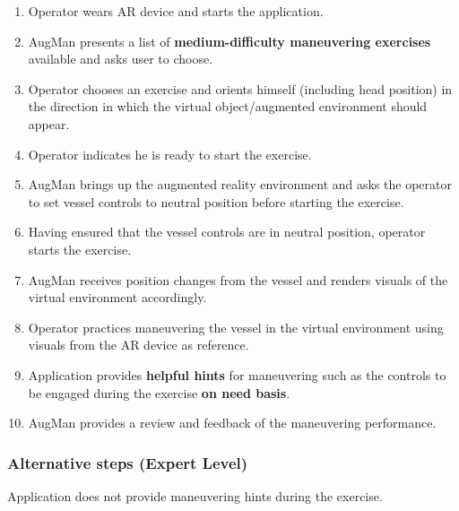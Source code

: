 \begin{enumerate}[noitemsep]
	\item Operator wears AR device and starts the application. 
	\item AugMan presents a list of \textbf{medium-difficulty maneuvering exercises} available and asks user to choose.
	\item Operator chooses an exercise and orients himself (including head position) in the direction in which the virtual object/augmented environment should appear.
	\item Operator indicates he is ready to start the exercise.
	\item AugMan brings up the augmented reality environment and asks the operator to set vessel controls to neutral position before starting the exercise.
	\item Having ensured that the vessel controls are in neutral position, operator starts the exercise. 
	\item AugMan receives position changes from the vessel and renders visuals of the virtual environment accordingly.
	\item Operator practices maneuvering the vessel in the virtual environment using visuals from the AR device as reference.
	\item Application provides \textbf{helpful hints} for maneuvering such as the controls to be engaged during the exercise \textbf{on need basis}.
	\item AugMan provides a review and feedback of the maneuvering performance.
\end{enumerate}


\subsubsection{Alternative steps (Expert Level)}

Application does not provide maneuvering hints during the exercise.

